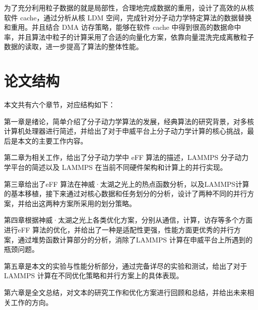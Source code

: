 为了充分利用粒子数据的就是局部性，合理地完成数据的重用，设计了高效的从核软件 cache，通过分析从核 LDM 空间，完成针对分子动力学特定算法的数据替换和重用。并且结合 DMA 访存策略，能够在软件 cache 中得到很高的数据命中率，并且算法中粒子的计算采用了合适的向量化方案，依靠向量混洗完成离散粒子数据的读取，进一步提高了算法的整体性能。

\section{论文结构}
本文共有六个章节，对应结构如下：

第一章是绪论，简单介绍了分子动力学算法的发展，经典算法的研究背景，对多核计算机处理器进行简述，并给出了对于申威平台上分子动力学计算的核心挑战，最后是本文的主要工作内容。

第二章为相关工作，给出了分子动力学中 eFF 算法的描述，LAMMPS 分子动力学平台的简述以及 LAMMPS 在当前不同硬件架构和计算上的并行实现。

第三章给出了eFF 算法在神威·太湖之光上的热点函数分析，以及LAMMPS计算的基本移植，接下来通过对核心数据和任务划分的分析，设计了两种不同的并行方案，并给出这两种方案所采用的划分策略。

第四章根据神威·太湖之光上各类优化方案，分别从通信，计算，访存等多个方面进行eFF 算法的优化，并给出了一种是适配性更强，性能方面更优秀的并行方案，通过堆势函数计算部分的分析，消除了LAMMPS 计算在申威平台上所遇到的瓶颈问题。

第五章是本文的实验与性能分析部分，通过完备详尽的实验和测试，给出了对于 LAMMPS 计算在不同优化策略和并行方案上的具体表现。

第六章是全文总结，对文本的研究工作和优化方案进行回顾和总结，并给出未来相关工作的方向。

